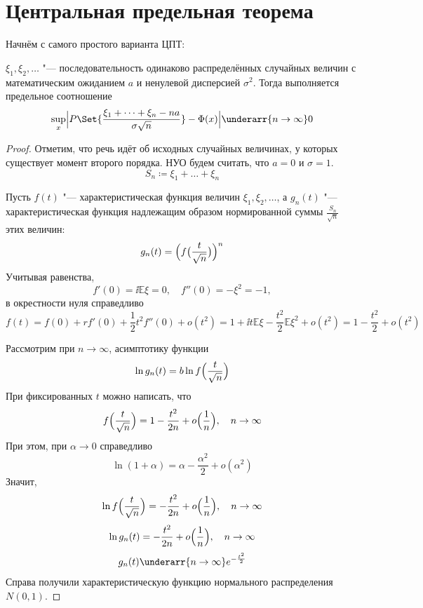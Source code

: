 \section{Центральная предельная теорема}

Начнём с самого простого варианта ЦПТ:
\begin{theorem}[Леви]
    $ \xi_1, \xi_2, \dotsc $ "--- последовательность одинаково распределённых случайных величин с
    математическим ожиданием $ a $ и ненулевой дисперсией $ \sigma^2 $.
    Тогда выполняется предельное соотношение
    $$ \sup\limits_x \Bigl| P \Set{\frac{\xi_1 + \dots + \xi_n - na}{\sigma \sqrt n}} -
    \Phi(x) \Bigr| \underarr{n \to \infty} 0 $$
\end{theorem}

\begin{proof}
    Отметим, что речь идёт об исходных случайных величинах, у которых существует момент второго
    порядка.
    НУО будем считать, что $ a = 0 $ и $ \sigma = 1 $.
    $$ S_n \coloneq \xi_1 + \dots + \xi_n $$

    Пусть $ f(t) $ "--- характеристическая функция величин $ \xi_1, \xi_2, \dotsc $, а
    $ g_n(t) $ "--- характеристическая функция надлежащим образом нормированной суммы
    $ \frac{S_n}{\sqrt n} $ этих величин:
    $$ g_n(t) = \Bigl( f \bigl( \frac{t}{\sqrt n} \bigr) \Bigr)^n $$
    Учитывая равенства,
    $$ f'(0) = \ii \mathbb E \xi = 0, \quad f''(0) = -\mathbb \xi^2 = -1, $$
    в окрестности нуля справедливо
    $$ f(t) = f(0) + rf'(0) + \frac12 t^2 f''(0) + o(t^2) = 1 + \ii t \mathbb E \xi - \frac{t^2}2
    \mathbb E \xi^2 + o(t^2) = 1 - \frac{t^2}2 + o(t^2) $$

    Рассмотрим при $ n \to \infty $, асимптотику функции
    $$ \ln g_n(t) = b \ln f \Bigl( \frac t {\sqrt n} \Bigr) $$
    При фиксированных $ t $ можно написать, что
    $$ f \Bigl( \frac{t}{\sqrt n} \Bigr) = 1 - \frac{t^2}{2n} + o \Bigl( \frac1n \Bigr), \quad
    n \to \infty $$
    При этом, при $ \alpha \to 0 $ справедливо
    $$ \ln(1 + \alpha) = \alpha - \frac{\alpha^2}2 + o(\alpha^2) $$
    Значит,
    $$ \ln f \Bigl( \frac{t}{\sqrt n} \Bigr) = -\frac{t^2}{2n} + o \Bigl( \frac1n \Bigr), \quad
    n \to \infty $$
    $$ \ln g_n(t) = -\frac{t^2}{2n} + o \Bigl( \frac1n \Bigr), \quad n \to \infty $$
    $$ g_n(t) \underarr{n \to \infty} e^{-\frac{t^2}2} $$
    Справа получили характеристическую функцию нормального распределения $ N(0, 1) $.
\end{proof}

